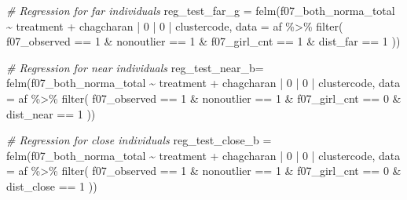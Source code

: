 \documentclass[
]{article}
\newenvironment{Shaded}{\begin{snugshade}}{\end{snugshade}}
\newcommand{\AttributeTok}[1]{\textcolor[rgb]{0.77,0.63,0.00}{#1}}
\newcommand{\CommentTok}[1]{\textcolor[rgb]{0.56,0.35,0.01}{\textit{#1}}}
\newcommand{\DecValTok}[1]{\textcolor[rgb]{0.00,0.00,0.81}{#1}}
\newcommand{\FunctionTok}[1]{\textcolor[rgb]{0.00,0.00,0.00}{#1}}
\newcommand{\NormalTok}[1]{#1}
\newcommand{\OtherTok}[1]{\textcolor[rgb]{0.56,0.35,0.01}{#1}}
\newcommand{\SpecialCharTok}[1]{\textcolor[rgb]{0.00,0.00,0.00}{#1}}
\begin{document}
\begin{Shaded}
\begin{Highlighting}[]
\CommentTok{\# Regression for far individuals}
\NormalTok{reg\_test\_far\_g }\OtherTok{=} \FunctionTok{felm}\NormalTok{(f07\_both\_norma\_total }\SpecialCharTok{\textasciitilde{}}\NormalTok{ treatment }\SpecialCharTok{+} 
\NormalTok{                   chagcharan }\SpecialCharTok{|} \DecValTok{0} \SpecialCharTok{|} \DecValTok{0} \SpecialCharTok{|}\NormalTok{ clustercode,}
         \AttributeTok{data =}\NormalTok{ af }\SpecialCharTok{\%\textgreater{}\%} \FunctionTok{filter}\NormalTok{( }
\NormalTok{                              f07\_observed }\SpecialCharTok{==} \DecValTok{1} \SpecialCharTok{\&}
\NormalTok{                              nonoutlier }\SpecialCharTok{==} \DecValTok{1} \SpecialCharTok{\&}
\NormalTok{                              f07\_girl\_cnt }\SpecialCharTok{==} \DecValTok{1} \SpecialCharTok{\&}
\NormalTok{                              dist\_far }\SpecialCharTok{==} \DecValTok{1}
\NormalTok{                              ))}

\CommentTok{\# Regression for near individuals}
\NormalTok{reg\_test\_near\_b}\OtherTok{=} \FunctionTok{felm}\NormalTok{(f07\_both\_norma\_total }\SpecialCharTok{\textasciitilde{}}\NormalTok{ treatment }\SpecialCharTok{+} 
\NormalTok{                   chagcharan }\SpecialCharTok{|} \DecValTok{0} \SpecialCharTok{|} \DecValTok{0} \SpecialCharTok{|}\NormalTok{ clustercode,}
         \AttributeTok{data =}\NormalTok{ af }\SpecialCharTok{\%\textgreater{}\%} \FunctionTok{filter}\NormalTok{( }
\NormalTok{                              f07\_observed }\SpecialCharTok{==} \DecValTok{1} \SpecialCharTok{\&}
\NormalTok{                              nonoutlier }\SpecialCharTok{==} \DecValTok{1} \SpecialCharTok{\&}
\NormalTok{                              f07\_girl\_cnt }\SpecialCharTok{==} \DecValTok{0} \SpecialCharTok{\&}
\NormalTok{                              dist\_near }\SpecialCharTok{==} \DecValTok{1}
\NormalTok{                              ))}

\CommentTok{\# Regression for close individuals}
\NormalTok{reg\_test\_close\_b }\OtherTok{=} \FunctionTok{felm}\NormalTok{(f07\_both\_norma\_total }\SpecialCharTok{\textasciitilde{}}\NormalTok{ treatment }\SpecialCharTok{+} 
\NormalTok{                   chagcharan }\SpecialCharTok{|} \DecValTok{0} \SpecialCharTok{|} \DecValTok{0} \SpecialCharTok{|}\NormalTok{ clustercode,}
         \AttributeTok{data =}\NormalTok{ af }\SpecialCharTok{\%\textgreater{}\%} \FunctionTok{filter}\NormalTok{( }
\NormalTok{                              f07\_observed }\SpecialCharTok{==} \DecValTok{1} \SpecialCharTok{\&}
\NormalTok{                              nonoutlier }\SpecialCharTok{==} \DecValTok{1} \SpecialCharTok{\&}
\NormalTok{                              f07\_girl\_cnt }\SpecialCharTok{==} \DecValTok{0} \SpecialCharTok{\&}
\NormalTok{                              dist\_close }\SpecialCharTok{==} \DecValTok{1}
\NormalTok{                              ))}


\end{Highlighting}
\end{Shaded}
\end{document}
